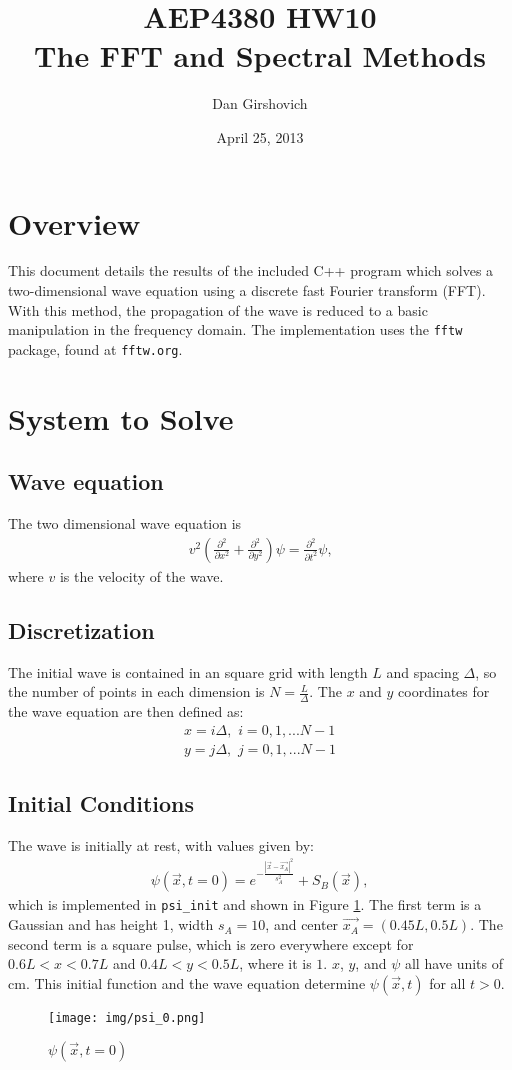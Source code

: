 \documentclass[12pt]{article}
\title{AEP4380 HW10 \\ The FFT and Spectral Methods }
\author{Dan Girshovich}
\date{April 25, 2013}
\newcommand{\secpd}[1]{\frac{\partial^2}{\partial #1^2}}
\begin{document}
\maketitle
\section{Overview}
This document details the results of the included C++ program which solves a two-dimensional wave equation using a discrete fast Fourier transform (FFT). With this method, the propagation of the wave is reduced to a basic manipulation in the frequency domain. The implementation uses the \texttt{fftw} package, found at \texttt{fftw.org}.
\section{System to Solve}
\subsection{Wave equation}
The two dimensional wave equation is
\begin{align*}
v^2 \left(\secpd{x} + \secpd{y} \right) \psi = \secpd{t} \psi \text{,}
\end{align*}
where $v$ is the velocity of the wave.
\subsection{Discretization}
The initial wave is contained in an square grid with length $L$ and spacing $\Delta$, so the number of points in each dimension is $N = \frac{L}{\Delta}$. The $x$ and $y$ coordinates for the wave equation are then defined as:
\begin{align*}
x = i \Delta, \,\, i = 0, 1, ... N - 1 \\
y = j \Delta, \,\, j = 0, 1, ... N - 1
\end{align*}
\subsection{Initial Conditions}
The wave is initially at rest, with values given by:
\begin{align*}
\psi(\vec{x}, t = 0) = e^{-\frac{|\vec{x} - \vec{x_A}|^2}{s_A^2}} + S_B(\vec{x}),
\end{align*}
which is implemented in \texttt{psi\_init} and shown in Figure \ref{f1}. The first term is a Gaussian and has height 1, width $s_A = 10$, and center $\vec{x_A} = (0.45L, 0.5L)$. The second term is a square pulse, which is zero everywhere except for $0.6L < x < 0.7L$ and $0.4L < y < 0.5L$, where it is $1$. $x$, $y$, and $\psi$ all have units of cm. This initial function and the wave equation determine $\psi(\vec{x}, t)$ for all $t>0$.
\begin{figure}
  \centering
  \texttt{[image: img/psi\_0.png]}
  \caption{$\psi(\vec{x}, t = 0)$}
  \label{f1}
\end{figure}
\end{document}
